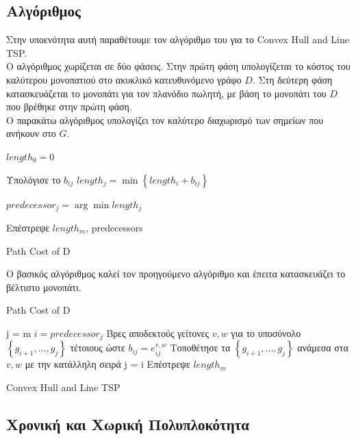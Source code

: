 \documentclass[oneside,12pt]{book}
\theoremstyle{definition}
\begin{document}
\subsection{Αλγόριθμος}

Στην υποενότητα αυτή παραθέτουμε τον αλγόριθμο του \cite{17} για το Convex Hull and Line TSP.  \\

Ο αλγόριθμος χωρίζεται σε δύο φάσεις. Στην πρώτη φάση υπολογίζεται το κόστος του καλύτερου μονοπατιού στο ακυκλικό κατευθυνόμενο γράφο \(D\). Στη δεύτερη φάση κατασκευάζεται το μονοπάτι για τον πλανόδιο πωλητή, με βάση το μονοπάτι του \(D\) που βρέθηκε στην πρώτη φάση. \\

Ο παρακάτω αλγόριθμος υπολογίζει τον καλύτερο διαχωρισμό των σημείων που ανήκουν στο \(G\). \\

\begin{algorithm}[H]
	\SetAlgoLined

	\(length_0 = 0\) \;
	{
		{
			Υπολόγισε το \(b_{ij}\) \;
			\(length_j = \min \left\{ length_i + b_{ij} \right\}\) \;
		}

		\(predecessor_j = \arg \min length_j\)
	}
	Επέστρεψε \(length_m \), predecessors

	\caption{Path Cost of D}
\end{algorithm}

Ο βασικός αλγόριθμος καλεί τον προηγούμενο αλγόριθμο και έπειτα κατασκευάζει το βέλτιστο μονοπάτι. \\

\begin{algorithm}[H]
	\SetAlgoLined


	Path Cost of D \;

	j = m \;
	{
		\(i = predecessor_j\) \;
		Βρες αποδεκτούς γείτονες \(v,w\) για το υποσύνολο \(\left\{ g_{i+1},...,g_j \right\}\) τέτοιους ώστε \(b_{ij} = e^{v,w}_{ij}\) \;
		Τοποθέτησε τα \(\left\{ g_{i+1},...,g_j \right\}\) ανάμεσα στα \(v,w\) με την κατάλληλη σειρά \;
		j = i \;
	}
	Επέστρεψε \(length_m \)

	\caption{Convex Hull and Line TSP}
\end{algorithm}

\subsection{Χρονική και Χωρική Πολυπλοκότητα}
\end{document}

